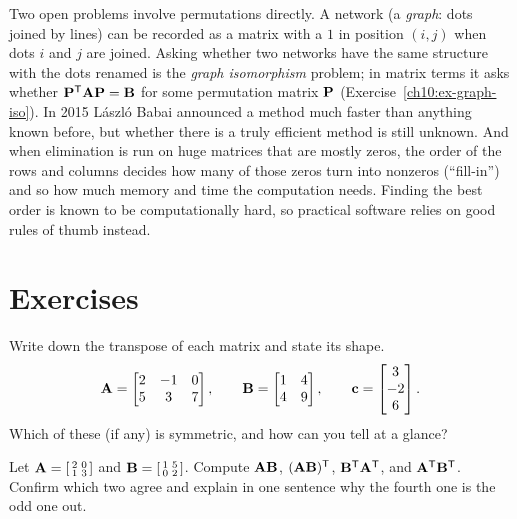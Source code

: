 \begin{historybox}
Two open problems involve permutations directly. A network (a \emph{graph}: dots joined by lines)
can be recorded as a matrix with a $1$ in position $(i,j)$ when dots $i$ and $j$ are joined.
Asking whether two networks have the same structure with the dots renamed is the
\emph{graph isomorphism} problem; in matrix terms it asks whether $\mathbf{P}^{\mathsf{T}}\mathbf{A}\mathbf{P} = \mathbf{B}$
for some permutation matrix $\mathbf{P}$ (Exercise~\ref{ch10:ex-graph-iso}). In 2015 L\'aszl\'o Babai
announced a method much faster than anything known before, but whether there is a truly efficient
method is still unknown. And when elimination is run on huge matrices that are mostly zeros, the
order of the rows and columns decides how many of those zeros turn into nonzeros (``fill-in'') and
so how much memory and time the computation needs. Finding the best order is known to be
computationally hard, so practical software relies on good rules of thumb instead.
\end{historybox}

\section{Exercises}

\begin{exercise}\label{ch10:ex-warmup}
Write down the transpose of each matrix and state its shape.
\[
  \mathbf{A}=\begin{bmatrix} 2 & -1 & 0 \\ 5 & 3 & 7 \end{bmatrix},\qquad
  \mathbf{B}=\begin{bmatrix} 1 & 4 \\ 4 & 9 \end{bmatrix},\qquad
  \mathbf{c}=\begin{bmatrix}3\\-2\\6\end{bmatrix}.
\]
Which of these (if any) is symmetric, and how can you tell at a glance?
\end{exercise}

\begin{exercise}\label{ch10:ex-reversal}
Let $\mathbf{A}=\left[\begin{smallmatrix}2&0\\1&3\end{smallmatrix}\right]$ and
$\mathbf{B}=\left[\begin{smallmatrix}1&5\\0&2\end{smallmatrix}\right]$. Compute $\mathbf{A}\mathbf{B}$,
$(\mathbf{A}\mathbf{B})^{\mathsf{T}}$, $\mathbf{B}^{\mathsf{T}}\mathbf{A}^{\mathsf{T}}$, and $\mathbf{A}^{\mathsf{T}}\mathbf{B}^{\mathsf{T}}$. Confirm which two agree and
explain in one sentence why the fourth one is the odd one out.
\end{exercise}

